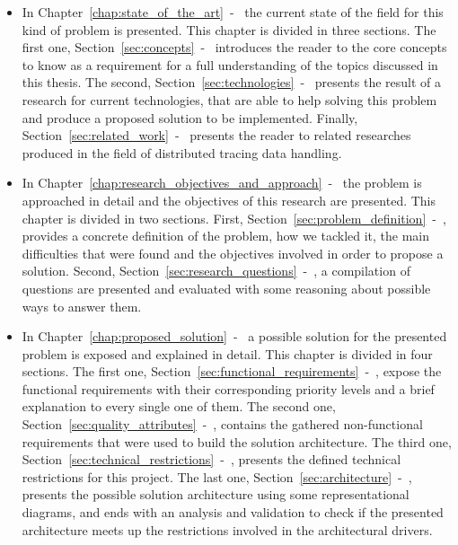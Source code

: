 \begin{itemize}
    \item In Chapter~\ref{chap:state_of_the_art}~-~ the current state of the field for this kind of problem is presented. This chapter is divided in three sections. The first one, Section~\ref{sec:concepts}~-~ introduces the reader to the core concepts to know as a requirement for a full understanding of the topics discussed in this thesis. The second, Section~\ref{sec:technologies}~-~ presents the result of a research for current technologies, that are able to help solving this problem and produce a proposed solution to be implemented. Finally, Section~\ref{sec:related_work}~-~ presents the reader to related researches produced in the field of distributed tracing data handling.
    \item In Chapter~\ref{chap:research_objectives_and_approach}~-~ the problem is approached in detail and the objectives of this research are presented. This chapter is divided in two sections. First, Section~\ref{sec:problem_definition}~-~, provides a concrete definition of the problem, how we tackled it, the main difficulties that were found and the objectives involved in order to propose a solution. Second, Section~\ref{sec:research_questions}~-~, a compilation of questions are presented and evaluated with some reasoning about possible ways to answer them.
    \item In Chapter~\ref{chap:proposed_solution}~-~ a possible solution for the presented problem is exposed and explained in detail. This chapter is divided in four sections. The first one, Section~\ref{sec:functional_requirements}~-~, expose the functional requirements with their corresponding priority levels and a brief explanation to every single one of them. The second one, Section~\ref{sec:quality_attributes}~-~, contains the gathered non-functional requirements that were used to build the solution architecture. The third one, Section~\ref{sec:technical_restrictions}~-~, presents the defined technical restrictions for this project. The last one, Section~\ref{sec:architecture}~-~, presents the possible solution architecture using some representational diagrams, and ends with an analysis and validation to check if the presented architecture meets up the restrictions involved in the architectural drivers.

\end{itemize}

